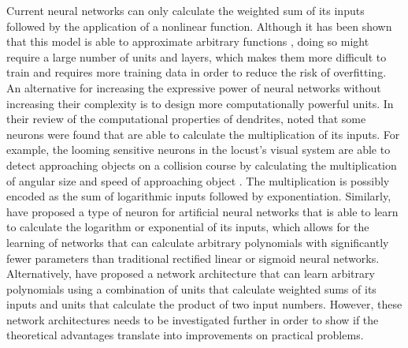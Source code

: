 Current neural networks can only calculate the weighted sum of its inputs
followed by the application of a nonlinear function. Although it has been shown
that this model is able to approximate arbitrary functions \citep{cybenko1989},
doing so might require a large number of units and layers, which makes them more
difficult to train and requires more training data in order to reduce the risk
of overfitting. An alternative for increasing the expressive power of neural
networks without increasing their complexity is to design more computationally
powerful units. In their review of the computational properties of dendrites,
\citet{london2005} noted that some neurons were found that are able to calculate
the multiplication of its inputs. For example, the looming sensitive neurons in
the locust's visual system are able to detect approaching objects on a collision
course by calculating the multiplication of angular size and speed of
approaching object \citep{london2005}. The multiplication is possibly encoded as
the sum of logarithmic inputs followed by exponentiation. Similarly,
\citet{godfrey2016} have proposed a type of neuron for artificial neural
networks that is able to learn to calculate the logarithm or exponential of its
inputs, which allows for the learning of networks that can calculate arbitrary
polynomials with significantly fewer parameters than traditional rectified
linear or sigmoid neural networks. Alternatively, \citet{livni2013} have proposed a
network architecture that can learn arbitrary polynomials using a combination of
units that calculate weighted sums of its inputs and units that calculate the
product of two input numbers. However, these network architectures needs to be
investigated further in order to show if the theoretical advantages translate
into improvements on practical problems.
